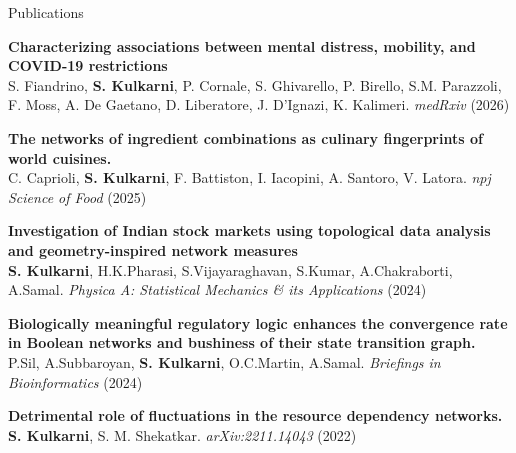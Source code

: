 \begin{rSection}{Publications}

    \item \textbf{Characterizing associations between mental distress, mobility, and COVID-19 restrictions} \\
    S. Fiandrino, \textbf{S. Kulkarni}, P. Cornale, S. Ghivarello, P. Birello, S.M. Parazzoli, F. Moss, A. De Gaetano, D. Liberatore, J. D’Ignazi, K. Kalimeri. \textit{medRxiv} (2026)
    
    \item \textbf{The networks of ingredient combinations as culinary fingerprints of world cuisines.}\\
    C. Caprioli, \textbf{S. Kulkarni}, F. Battiston, I. Iacopini, A. Santoro, V. Latora. \textit{npj Science of Food} (2025)
    
    \item \textbf{Investigation of Indian stock markets using topological data analysis and geometry-inspired network measures} \\
    \textbf{S. Kulkarni}, H.K.Pharasi, S.Vijayaraghavan, S.Kumar, A.Chakraborti, A.Samal. \textit{Physica A: Statistical Mechanics \& its Applications} (2024)
    
    \item \textbf{Biologically meaningful regulatory logic enhances the convergence rate in Boolean networks and bushiness of their state transition graph.} \\
    P.Sil, A.Subbaroyan, \textbf{S. Kulkarni}, O.C.Martin, A.Samal. \textit{Briefings in Bioinformatics} (2024)
    
    \item \textbf{Detrimental role of fluctuations in the resource dependency networks.} \\ 
    \textbf{S. Kulkarni}, S. M. Shekatkar. \textit{arXiv:2211.14043} (2022)
    
\end{rSection}

